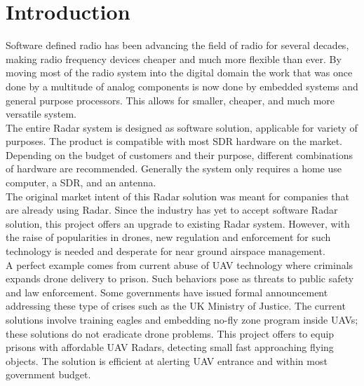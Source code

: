 \documentclass[letterpaper, 12 pt, conference]{report}
\numberwithin{figure}{section}
\begin{document}
\section{Introduction}

Software defined radio has been advancing the field of radio for several decades, making radio frequency devices cheaper and much more flexible than ever. By moving most of the radio system into the digital domain the work that was once done by a multitude of analog components is now done by embedded systems and general purpose processors. This allows for smaller, cheaper, and much more versatile system.\\

The entire Radar system is designed as software solution, applicable for variety of purposes. The product is compatible with most SDR hardware on the market. Depending on the budget of customers and their purpose, different combinations of hardware are recommended. Generally the system only requires a home use computer, a SDR, and an antenna. \\

The original market intent of this Radar solution was meant for companies that are already using Radar. Since the industry has yet to accept software Radar solution, this project offers an upgrade to existing Radar system. However, with the raise of popularities in drones, new regulation and enforcement for such technology is needed and desperate for near ground airspace management.\\

A perfect example comes from current abuse of UAV technology where criminals expands drone delivery to prison. Such behaviors pose as threats to public safety and law enforcement. Some governments have issued formal announcement addressing these type of crises such as the UK Ministry of Justice\cite{noauthor_uk_2016}. The current solutions involve training eagles and embedding no-fly zone program inside UAVs; these solutions do not eradicate drone problems. This project offers to equip prisons with affordable UAV Radars, detecting small fast approaching flying objects. The solution is efficient at alerting UAV entrance and within most government budget.\\

\end{document}
